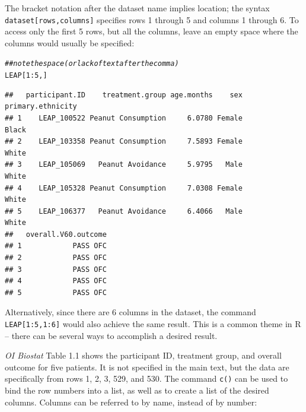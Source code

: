 \documentclass{report}\usepackage[]{graphicx}\usepackage[]{color}
\makeatletter
\newcommand{\hlnum}[1]{\textcolor[rgb]{0.686,0.059,0.569}{#1}}%
\newcommand{\hlcom}[1]{\textcolor[rgb]{0.678,0.584,0.686}{\textit{#1}}}%
\newcommand{\hlopt}[1]{\textcolor[rgb]{0,0,0}{#1}}%
\newcommand{\hlstd}[1]{\textcolor[rgb]{0.345,0.345,0.345}{#1}}%
\newenvironment{kframe}{%
 \def\at@end@of@kframe{}%
 \ifinner\ifhmode%
  \def\at@end@of@kframe{\end{minipage}}%
  \begin{minipage}{\columnwidth}%
 \fi\fi%
 \def\FrameCommand##1{\hskip\@totalleftmargin \hskip-\fboxsep
 \colorbox{shadecolor}{##1}\hskip-\fboxsep
     \hskip-\linewidth \hskip-\@totalleftmargin \hskip\columnwidth}%
 \MakeFramed {\advance\hsize-\width
   \@totalleftmargin\z@ \linewidth\hsize
   \@setminipage}}%
 {\par\unskip\endMakeFramed%
 \at@end@of@kframe}
\newenvironment{knitrout}{}{} %
\makeatother
\begin{document}
The bracket notation after the dataset name implies location; the syntax \texttt{dataset[rows,columns]} specifies rows 1 through 5 and columns 1 through 6. To access only the first 5 rows, but all the columns, leave an empty space where the columns would usually be specified:

\begin{knitrout}
\color{fgcolor}\begin{kframe}
\begin{alltt}
\hlcom{## note the space (or lack of text after the comma)}
\hlstd{LEAP[}\hlnum{1}\hlopt{:}\hlnum{5}\hlstd{, ]}
\end{alltt}
\begin{verbatim}
##   participant.ID    treatment.group age.months    sex primary.ethnicity
## 1    LEAP_100522 Peanut Consumption     6.0780 Female             Black
## 2    LEAP_103358 Peanut Consumption     7.5893 Female             White
## 3    LEAP_105069   Peanut Avoidance     5.9795   Male             White
## 4    LEAP_105328 Peanut Consumption     7.0308 Female             White
## 5    LEAP_106377   Peanut Avoidance     6.4066   Male             White
##   overall.V60.outcome
## 1            PASS OFC
## 2            PASS OFC
## 3            PASS OFC
## 4            PASS OFC
## 5            PASS OFC
\end{verbatim}
\end{kframe}
\end{knitrout}

Alternatively, since there are 6 columns in the dataset, the command \texttt{LEAP[1:5,1:6]} would also achieve the same result. This is a common theme in \textsf{R} -- there can be several ways to accomplish a desired result. 

\textit{OI Biostat} Table 1.1 shows the participant ID, treatment group, and overall outcome for five patients. It is not specified in the main text, but the data are specifically from rows 1, 2, 3, 529, and 530. The command \texttt{c()} can be used to bind the row numbers into a list, as well as to create a list of the desired columns. Columns can be referred to by name, instead of by number:
\end{document}
